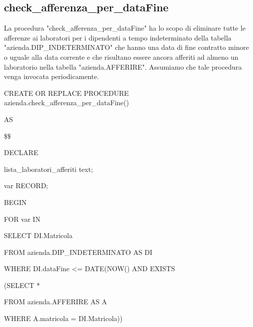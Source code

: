         \subsection{check\_afferenza\_per\_dataFine}
        La procedura "check\_afferenza\_per\_dataFine" ha lo scopo di eliminare tutte le afferenze ai laboratori per i dipendenti a tempo indeterminato della tabella "azienda.DIP\_INDETERMINATO" che hanno una data di fine contratto minore o uguale alla data corrente e che risultano essere ancora afferiti ad almeno un laboratorio nella tabella "azienda.AFFERIRE". Assumiamo che tale procedura venga invocata periodicamente.
        \ttfamily
            \begin{flushleft}
                \begin{description}
                    \item CREATE OR REPLACE PROCEDURE azienda.check\_afferenza\_per\_dataFine()  
                    \item AS
                    \item \$\$
                    \item DECLARE
                    \begin{description}
                        \item lista\_laboratori\_afferiti text;
                        \item var RECORD;
                    \end{description}
                    \item BEGIN 
                    \begin{description}
                        \item FOR var IN 
                        \begin{description}
                            \item SELECT DI.Matricola
                            \item FROM azienda.DIP\_INDETERMINATO AS DI
                            \item WHERE DI.dataFine <= DATE(NOW() AND EXISTS
                            \begin{description}
                               \item (SELECT *
                                \item FROM azienda.AFFERIRE AS A
                                \item WHERE A.matricola = DI.Matricola))
                            \end{description}
                        \end{description}
                    

\end{description}
\end{description}
\end{flushleft}
